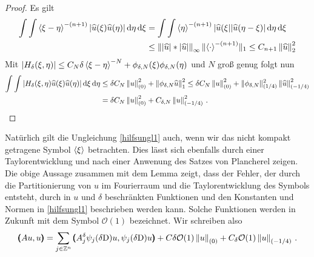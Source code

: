 \begin{proof}
Es gilt
\begin{align*}
\int\int\braket{\xi-\eta}^{-(n+1)}|\widehat u(\xi)\widehat u(\eta)|\,\mathrm d\eta\,\mathrm d\xi &= \int\int \braket{\eta}^{-(n+1)}|\widehat{u}(\xi||\widehat u(\eta-\xi)|\,\mathrm d\eta\,\mathrm d\xi\\
&\le \left\lVert\lvert\widehat u\rvert * \lvert\widehat u\rvert\right\rVert_\infty \lVert\braket{\cdot}^{-(n+1)}\rVert_1\le C_{n+1} \left\lVert\widehat u\right\rVert_2^2
\end{align*}
Mit $|H_\delta(\xi,\eta)|\le C_N\delta\braket{\xi-\eta}^{-N} +\phi_{\delta,N}(\xi)\phi_{\delta,N}(\eta)$ und $N$ groß genug folgt nun
\begin{align*}
\int\int|H_\delta(\xi,\eta)\widehat u(\xi)\widehat u(\eta)|\,\mathrm d\xi\,\mathrm d\eta &\le \delta C_N \left\lVert u\right\rVert^2_{(0)} + \left\lVert\phi_{\delta,N} \widehat u\right\rVert_1^2 \le \delta C_N \left\lVert u\right\rVert^2_{(0)} + \|\phi_{\delta,N}\|_{(1/4)}^2 \left\lVert\widehat u\right\rVert_{(-1/4)}^2 \\
&= \delta C_N \left\lVert u\right\rVert^2_{(0)} +  C_{\delta,N} \left\lVert u\right\rVert_{(-1/4)}^2\,.
\end{align*}

\end{proof}

Natürlich gilt die Ungleichung \eqref{hilfsungl1} auch, wenn wir das nicht kompakt getragene Symbol $\braket{\xi}$ betrachten. Dies lässt sich ebenfalls durch einer Taylorentwicklung und nach einer Anwenung des Satzes von Plancherel zeigen.
Die obige Aussage zusammen mit dem Lemma zeigt, dass der Fehler, der durch die Partitionierung von $u$ im Fourierraum und die Taylorentwicklung des Symbols entsteht, durch in $u$ und $\delta$ beschränkten Funktionen und den Konstanten und Normen in \eqref{hilfsungl1} beschrieben werden kann. Solche Funktionen werden in Zukunft mit dem Symbol $\mathcal O(1)$ bezeichnet. Wir schreiben also
\begin{align*}
\pmb(Au,u\pmb) = \sum_{j\in\mathbb Z^n} \pmb(A_j^\delta \psi_j(\delta\mathrm D)u,\psi_j(\delta\mathrm D)u\pmb) + C\delta \mathcal{O}(1) \left\lVert u\right\rVert_{(0)} + C_\delta \mathcal O(1)\left\lVert u\right\rVert_{(-1/4)}\,.
\end{align*}

